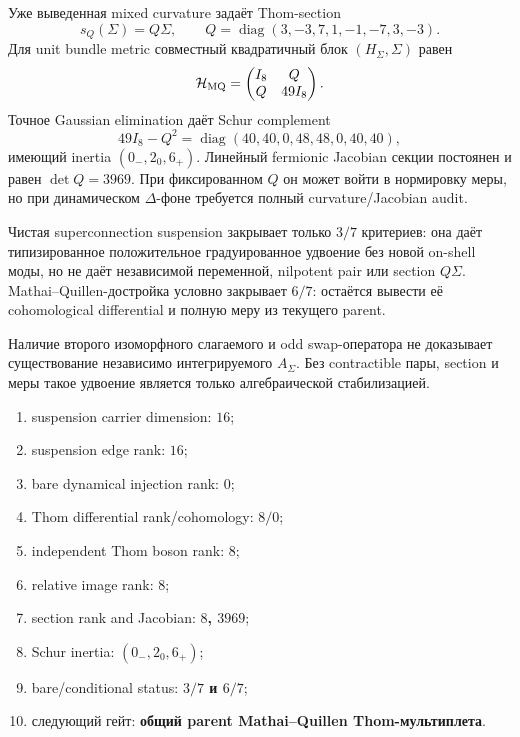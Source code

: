 Уже выведенная mixed curvature задаёт Thom-section
\begin{equation}
 s_Q(\Sigma)=Q\Sigma,
 \qquad
 Q=\operatorname{diag}(3,-3,7,1,-1,-7,3,-3).
\end{equation}
Для unit bundle metric совместный квадратичный блок $(H_\Sigma,\Sigma)$
равен
\begin{equation}
 \mathcal H_{\rm MQ}=
 \begin{pmatrix}I_8&Q\\Q&49I_8\end{pmatrix}.
\end{equation}
Точное Gaussian elimination даёт Schur complement
\begin{equation}
 49I_8-Q^2
 =\operatorname{diag}(40,40,0,48,48,0,40,40),
\end{equation}
имеющий inertia $(0_-,2_0,6_+)$. Линейный fermionic Jacobian секции
постоянен и равен $\det Q=3969$. При фиксированном $Q$ он может войти в
нормировку меры, но при динамическом $\Delta$-фоне требуется полный
curvature/Jacobian audit.

\begin{theorem}
Чистая superconnection suspension закрывает только $3/7$ критериев: она
даёт типизированное положительное градуированное удвоение без новой
on-shell моды, но не даёт независимой переменной, nilpotent pair или
section $Q\Sigma$. Mathai--Quillen-достройка условно закрывает $6/7$:
остаётся вывести её cohomological differential и полную меру из текущего
parent.
\end{theorem}

\begin{nogocriterion}
Наличие второго изоморфного слагаемого и odd swap-оператора не доказывает
существование независимо интегрируемого $A_\Sigma$. Без contractible пары,
section и меры такое удвоение является только алгебраической
стабилизацией.
\end{nogocriterion}

\begin{protocol}\begin{enumerate}
\item suspension carrier dimension: \textbf{$16$};
\item suspension edge rank: \textbf{$16$};
\item bare dynamical injection rank: \textbf{$0$};
\item Thom differential rank/cohomology: \textbf{$8/0$};
\item independent Thom boson rank: \textbf{$8$};
\item relative image rank: \textbf{$8$};
\item section rank and Jacobian: \textbf{$8$, $3969$};
\item Schur inertia: \textbf{$(0_-,2_0,6_+)$};
\item bare/conditional status: \textbf{$3/7$ и $6/7$};
\item следующий гейт: \textbf{общий parent Mathai--Quillen Thom-мультиплета}.
\end{enumerate}\end{protocol}

